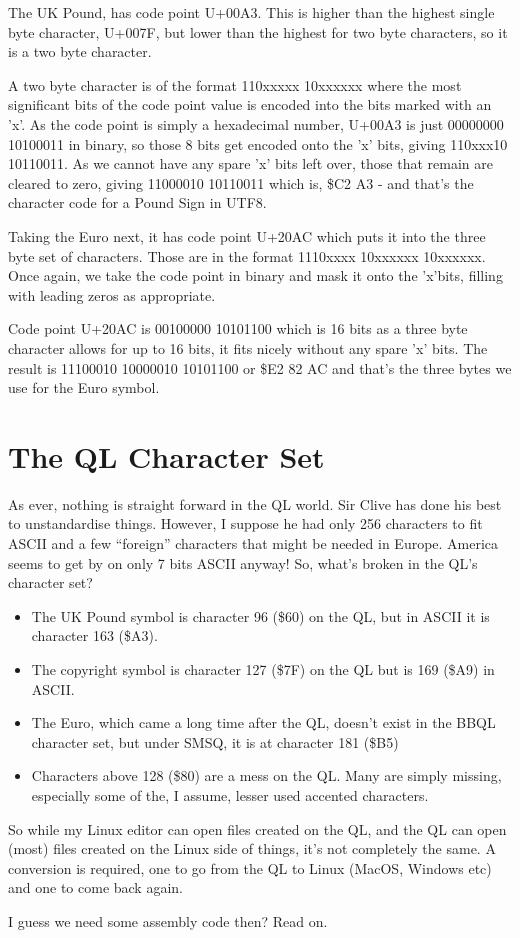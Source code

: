 The UK Pound, has code point U+00A3. This is higher than the highest
single byte character, U+007F, but lower than the highest for two
byte characters, so it is a two byte character.

A two byte character is of the format 110xxxxx 10xxxxxx where the
most significant bits of the code point value is encoded into the
bits marked with an 'x'. As the code point is simply a hexadecimal
number, U+00A3 is just 00000000 10100011 in binary, so those 8 bits
get encoded onto the 'x' bits, giving 110xxx10 10110011. As we cannot
have any spare 'x' bits left over, those that remain are cleared to zero, giving 11000010
10110011 which is, \$C2 A3 - and that's the character code for a Pound
Sign in UTF8.

Taking the Euro next, it has code point U+20AC which puts it into
the three byte set of characters. Those are in the format 1110xxxx
10xxxxxx 10xxxxxx. Once again, we take the code point in binary and
mask it onto the 'x'bits, filling with leading zeros as appropriate.

Code point U+20AC is 00100000 10101100 which is 16 bits as a three
byte character allows for up to 16 bits, it fits nicely without any
spare 'x' bits. The result is 11100010 10000010 10101100 or \$E2 82
AC and that's the three bytes we use for the Euro symbol.

\section{The QL Character Set}

As ever, nothing is straight forward in the QL world. Sir Clive has
done his best to unstandardise things. However, I suppose he had only
256 characters to fit ASCII and a few ``foreign'' characters that
might be needed in Europe. America seems to get by on only 7 bits
ASCII anyway! So, what's broken in the QL's character set?
\begin{itemize}
\item The UK Pound symbol is character 96 (\$60) on the QL, but in ASCII
it is character 163 (\$A3).
\item The copyright symbol is character 127 (\$7F) on the QL but is 169
(\$A9) in ASCII.
\item The Euro, which came a long time after the QL, doesn't exist in the
BBQL character set, but under SMSQ, it is at character 181 (\$B5)
\item Characters above 128 (\$80) are a mess on the QL. Many are simply
missing, especially some of the, I assume, lesser used accented characters.
\end{itemize}
So while my Linux editor can open files created on the QL, and the
QL can open (most) files created on the Linux side of things, it's
not completely the same. A conversion is required, one to go from
the QL to Linux (MacOS, Windows etc) and one to come back again.

I guess we need some assembly code then? Read on.


